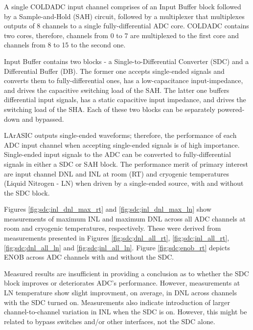 \label{sec:5.5}


A single COLDADC input channel comprises of an Input Buffer block followed by a Sample-and-Hold (SAH) circuit, followed by a multiplexer that multiplexes outputs of 8 channels to a single fully-differential ADC core. COLDADC contains two cores, therefore, channels from 0 to 7 are multiplexed to the first core and channels from 8 to 15 to the second one.

Input Buffer contains two blocks - a Single-to-Differential Converter (SDC) and a Differential Buffer (DB). The former one accepts single-ended signals and converts them to fully-differential ones, has a low-capacitance input-impedance, and drives the capacitive switching load of the SAH. The latter one buffers differential input signals, has a static capacitive input impedance, and drives the switching load of the SHA. Each of these two blocks can be separately powered-down and bypassed.

LArASIC outputs single-ended waveforms; therefore, the performance of each ADC input channel when accepting single-ended signals is of high importance. Single-ended input signals to the ADC can be converted to fully-differential signals in either a SDC or SAH block. The performance merit of primary interest are input channel DNL and INL at room (RT) and cryogenic temperatures (Liquid Nitrogen - LN) when driven by a single-ended source, with and without the SDC block.

Figures \ref{fig;sdc;inl_dnl_max_rt} and \ref{fig;sdc;inl_dnl_max_ln} show measurements of maximum INL and maximum DNL across all ADC channels at room and cryogenic temperatures, respectively. These were derived from measurements presented in Figures \ref{fig;sdc;dnl_all_rt}, \ref{fig;sdc;inl_all_rt}, \ref{fig;sdc;dnl_all_ln} and \ref{fig;sdc;inl_all_ln}. Figure \ref{fig;sdc;enob_rt} depicts ENOB across ADC channels with and without the SDC.

Measured results are insufficient in providing a conclusion as to whether the SDC block improves or deteriorates ADC's performance. However, measurements at LN temperature show slight improvment, on average, in DNL across channels with the SDC turned on. Measurements also indicate introduction of larger channel-to-channel variation in INL when the SDC is on. However, this might be related to bypass switches and/or other interfaces, not the SDC alone.

